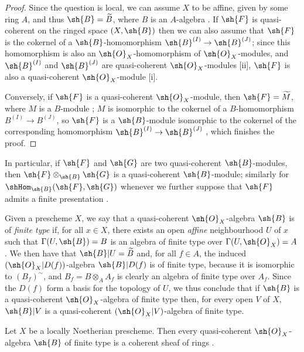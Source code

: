 \begin{proof}
Since the question is local, we can assume $X$ to be affine, given by some ring $A$, and thus $\sh{B}=\widetilde{B}$, where $B$ is an $A$-algebra .
If $\sh{F}$ is quasi-coherent on the ringed space $(X,\sh{B})$ then we can also assume that $\sh{F}$ is the cokernel of a $\sh{B}$-homomorphism $\sh{B}^{(I)}\to\sh{B}^{(J)}$; since this homomorphism is also an $\sh{O}_X$-homomorphism of $\sh{O}_X$-modules, and $\sh{B}^{(I)}$ and $\sh{B}^{(J)}$ are quasi-coherent $\sh{O}_X$-modules [ii], $\sh{F}$ is also a quasi-coherent $\sh{O}_X$-module [i].

Conversely, if $\sh{F}$ is a quasi-coherent $\sh{O}_X$-module, then $\sh{F}=\widetilde{M}$, where $M$ is a $B$-module ; $M$ is isomorphic to the cokernel of a $B$-homomorphism $B^{(I)}\to B^{(J)}$, so $\sh{F}$ is a $\sh{B}$-module isomorphic to the cokernel of the corresponding homomorphism $\sh{B}^{(I)}\to\sh{B}^{(J)}$ , which finishes the proof.
\end{proof}

In particular, if $\sh{F}$ and $\sh{G}$ are two quasi-coherent $\sh{B}$-modules, then $\sh{F}\otimes_{\sh{B}}\sh{G}$ is a quasi-coherent $\sh{B}$-module; similarly for $\shHom_{\sh{B}}(\sh{F},\sh{G})$ whenever we further suppose that $\sh{F}$ admits a finite presentation .

\begin{env}[9.6.2]
\label{I.9.6.2}
Given a prescheme $X$, we say that a quasi-coherent $\sh{O}_X$-algebra $\sh{B}$ is of \emph{finite type} if, for all $x\in X$, there exists an open \emph{affine} neighbourhood $U$ of $x$ such that $\Gamma(U,\sh{B})=B$ is an algebra of finite type over $\Gamma(U,\sh{O}_X)=A$.
We then have that $\sh{B}|U=\widetilde{B}$ and, for all $f\in A$, the induced $(\sh{O}_X|D(f))$-algebra $\sh{B}|D(f)$ is of finite type, because it is isomorphic to $(B_f)^{\sim}$, and $B_f=B\otimes_A A_f$ is clearly an algebra of finite type over $A_f$.
Since the $D(f)$ form a basis for the topology of $U$, we thus conclude that if $\sh{B}$ is a quasi-coherent $\sh{O}_X$-algebra of finite type then, for every open $V$ of $X$, $\sh{B}|V$ is a quasi-coherent $(\sh{O}_X|V)$-algebra of finite type.
\end{env}

\begin{proposition}[9.6.3]
\label{I.9.6.3}
Let $X$ be a locally Noetherian prescheme.
Then every quasi-coherent $\sh{O}_X$-algebra $\sh{B}$ of finite type is a coherent sheaf of rings .
\end{proposition}

